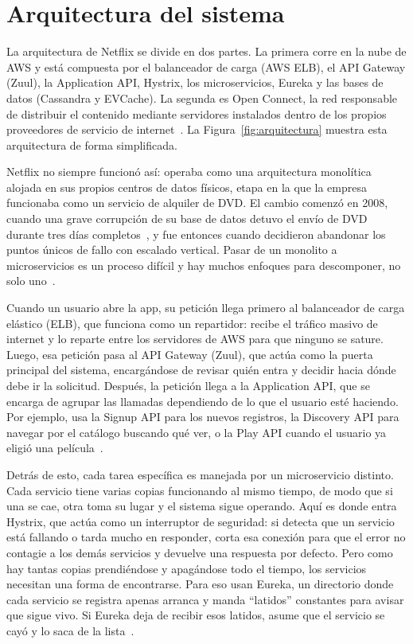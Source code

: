 \section{Arquitectura del sistema}

La arquitectura de Netflix se divide en dos partes. La primera corre en la nube de AWS y está compuesta por el balanceador de carga (AWS ELB), el API Gateway (Zuul), la Application API, Hystrix, los microservicios, Eureka y las bases de datos (Cassandra y EVCache). La segunda es Open Connect, la red responsable de distribuir el contenido mediante servidores instalados dentro de los propios proveedores de servicio de internet~\cite{Netflix_OpenConnect}. La Figura~\ref{fig:arquitectura} muestra esta arquitectura de forma simplificada.

Netflix no siempre funcionó así: operaba como una arquitectura monolítica alojada en sus propios centros de datos físicos, etapa en la que la empresa funcionaba como un servicio de alquiler de DVD. El cambio comenzó en 2008, cuando una grave corrupción de su base de datos detuvo el envío de DVD durante tres días completos~\cite{Netflix_CloudMigration}, y fue entonces cuando decidieron abandonar los puntos únicos de fallo con escalado vertical. Pasar de un monolito a microservicios es un proceso difícil y hay muchos enfoques para descomponer, no solo uno~\cite{Abgaz_2023,Oumoussa_2024}.

Cuando un usuario abre la app, su petición llega primero al balanceador de carga elástico (ELB), que funciona como un repartidor: recibe el tráfico masivo de internet y lo reparte entre los servidores de AWS para que ninguno se sature. Luego, esa petición pasa al API Gateway (Zuul), que actúa como la puerta principal del sistema, encargándose de revisar quién entra y decidir hacia dónde debe ir la solicitud. Después, la petición llega a la Application API, que se encarga de agrupar las llamadas dependiendo de lo que el usuario esté haciendo. Por ejemplo, usa la Signup API para los nuevos registros, la Discovery API para navegar por el catálogo buscando qué ver, o la Play API cuando el usuario ya eligió una película~\cite{Rangarajan_PlayAPI}.

Detrás de esto, cada tarea específica es manejada por un microservicio distinto. Cada servicio tiene varias copias funcionando al mismo tiempo, de modo que si una se cae, otra toma su lugar y el sistema sigue operando. Aquí es donde entra Hystrix, que actúa como un interruptor de seguridad: si detecta que un servicio está fallando o tarda mucho en responder, corta esa conexión para que el error no contagie a los demás servicios y devuelve una respuesta por defecto. Pero como hay tantas copias prendiéndose y apagándose todo el tiempo, los servicios necesitan una forma de encontrarse. Para eso usan Eureka, un directorio donde cada servicio se registra apenas arranca y manda \enquote{latidos} constantes para avisar que sigue vivo. Si Eureka deja de recibir esos latidos, asume que el servicio se cayó y lo saca de la lista~\cite{SpringCloudNetflix}.

